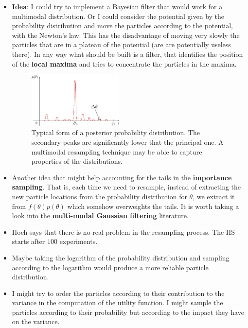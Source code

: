 \documentclass[aps, pra, 10pt, twocolumn, superscriptaddress,floatfix]{revtex4-1}
\begin{document}
\begin{itemize}
	\item \textbf{Idea}: I could try to implement a Bayesian filter that would work for a multimodal distribution. Or I could consider the potential given by the probability distribution and move the particles according to the potential, with the Newton's law. This has the disadvantage of moving very slowly the  particles that are in a plateau of the potential (are are potentially useless there). In any way what should be built is a filter, that identifies the position of the \textbf{local maxima} and tries to concentrate the particles in the maxima.
	\begin{figure}[!t]
		\begin{center}
			\includegraphics[width=0.45\textwidth]{immagini/typical.pdf}
		\end{center}
		\caption{Typical form of a posterior probability distribution. The secondary peaks are significantly lower that the principal one. A multimodal resampling technique may be able to capture properties of the distributions.}
		\label{fig:typical}
	\end{figure}
	\item Another idea that might help accounting for the tails in the \textbf{importance sampling}. That is, each time we need to resample, instead of extracting the new particle locations from the probability distribution for $\theta$, we extract it from $f(\theta) p(\theta)$ which somehow overweights the tails. It is worth taking a look into the \textbf{multi-modal Gaussian filtering} literature.
	  
	\item Hoch says that there is no real problem in the resampling process. The HS starts after $100$ experiments.
	
	\item Maybe taking the logarithm of the probability distribution and sampling according to the logarithm would produce a more reliable particle distribution.
	
	\item I might try to order the particles according to their contribution to the variance in the computation of the utility function. I might sample the particles according to their probability but according to the impact they have on the variance.
	

\end{itemize}
\end{document}
